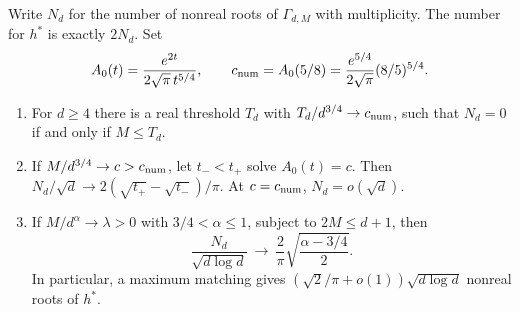 \begin{theorem}\label{thm:nonnumerator}
Write $N_d$ for the number of nonreal roots of $\Gamma_{d,M}$ with
multiplicity. The number for $h^*$ is exactly $2N_d$. Set
\[
 A_0(t)=\frac{e^{2t}}{2\sqrt\pi\,t^{5/4}},\qquad
 c_{\rm num} = A_0(5/8)=\frac{e^{5/4}}{2\sqrt\pi}(8/5)^{5/4}.
\]
\begin{enumerate}
\item For $d\ge4$ there is a real threshold $T_d$ with
$T_d/d^{3/4}\to c_{\rm num}$, such that $N_d=0$ if and only if $M\le T_d$.
\item If $M/d^{3/4}\to c>c_{\rm num}$, let $t_-<t_+$ solve $A_0(t)=c$.
Then $N_d/\sqrt d\to 2(\sqrt{t_+}-\sqrt{t_-})/\pi$.
At $c=c_{\rm num}$, $N_d=o(\sqrt d)$.
\item If $M/d^\alpha\to\lambda>0$ with $3/4<\alpha\le1$, subject to
$2M\le d+1$, then
\[
 \frac{N_d}{\sqrt{d\log d}}\ \longrightarrow\ 
 \frac{2}{\pi}\sqrt{\frac{\alpha-3/4}{2}} .
\]
In particular, a maximum matching gives
$(\sqrt2/\pi+o(1))\sqrt{d\log d}$ nonreal roots of $h^*$.
\end{enumerate}
\end{theorem}

